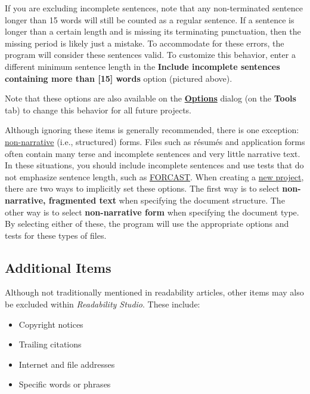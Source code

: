 \documentclass[
]{book}
\providecommand{\tightlist}{%
  \setlength{\itemsep}{0pt}\setlength{\parskip}{0pt}}
\theoremstyle{definition}
\theoremstyle{definition}
\theoremstyle{definition}
\theoremstyle{definition}
\theoremstyle{remark}
\begin{document}
If you are excluding incomplete sentences, note that any non-terminated sentence longer than 15 words will still be counted as a regular sentence. If a sentence is longer than a certain length and is missing its terminating punctuation, then the missing period is likely just a mistake. To accommodate for these errors, the program will consider these sentences valid. To customize this behavior, enter a different minimum sentence length in the \textbf{Include incomplete sentences containing more than {[}15{]} words} option (pictured above).

Note that these options are also available on the \protect\hyperlink{options-overview}{\textbf{Options}} dialog (on the \textbf{Tools} tab) to change this behavior for all future projects.

Although ignoring these items is generally recommended, there is one exception: \protect\hyperlink{framented-text}{non-narrative} (i.e., structured) forms. Files such as résumés and application forms often contain many terse and incomplete sentences and very little narrative text. In these situations, you should include incomplete sentences and use tests that do not emphasize sentence length, such as \protect\hyperlink{forcast-test}{FORCAST}. When creating a \protect\hyperlink{creating-standard-project}{new project}, there are two ways to implicitly set these options. The first way is to select \textbf{non-narrative, fragmented text} when specifying the document structure. The other way is to select \textbf{non-narrative form} when specifying the document type. By selecting either of these, the program will use the appropriate options and tests for these types of files.

\hypertarget{additional-items}{%
\subsection*{Additional Items}\label{additional-items}}

\begin{minipage}{\textwidth}

Although not traditionally mentioned in readability articles, other items may also be excluded within \emph{Readability Studio}. These include:

\begin{itemize}
\tightlist
\item
  Copyright notices
\item
  Trailing citations
\item
  Internet and file addresses
\item
  Specific words or phrases
\end{itemize}

\end{minipage}
\end{document}
